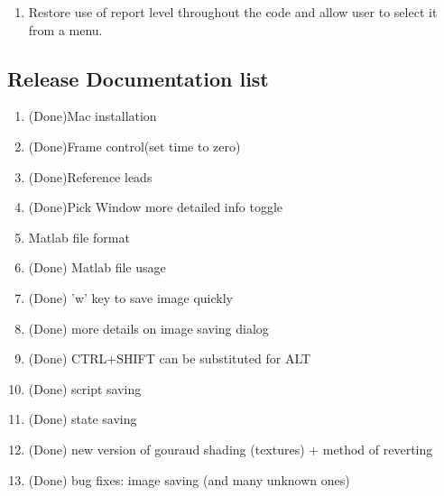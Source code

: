 \documentclass[11pt]{article}
\newcommand{\map}{\emph{map3d}}
\begin{document}
\begin{enumerate}
  \item Restore use of report level throughout the code and allow user to
        select it from a menu.
\end{enumerate}

\subsection{Release Documentation list}
\begin{enumerate}
\item (Done)Mac installation
\item (Done)Frame control(set time to zero)
\item (Done)Reference leads
\item (Done)Pick Window more detailed info toggle
\item Matlab file format
\item (Done) Matlab file usage
\item (Done) 'w' key to save image quickly
\item (Done) more details on image saving dialog
\item (Done) CTRL+SHIFT can be substituted for ALT
\item (Done) script saving
\item (Done) state saving
\item (Done) new version of gouraud shading (textures) + method of reverting
\item (Done) bug fixes: image saving (and many unknown ones) 
\end{enumerate}
\end{document}
